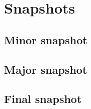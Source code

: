 \documentclass[../hydrozoa.tex]{subfiles}
\begin{document}
\section{Snapshots}%
\label{h:offchain-snapshots}


\subsection{Minor snapshot}%
\label{h:minor-snapshot}




\subsection{Major snapshot}%
\label{h:major-snapshot}




\subsection{Final snapshot}%
\label{h:final-snapshot}



\end{document}
